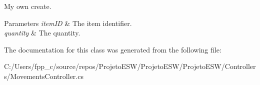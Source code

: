 My own create.


\begin{DoxyParams}{Parameters}
{\em item\+ID} & The item identifier.\\
\hline
{\em quantity} & The quantity.\\
\hline
\end{DoxyParams}


The documentation for this class was generated from the following file\+:\begin{DoxyCompactItemize}
\item 
C\+:/\+Users/fpp\+\_\+c/source/repos/\+Projeto\+E\+S\+W/\+Projeto\+E\+S\+W/\+Projeto\+E\+S\+W/\+Controllers/Movements\+Controller.\+cs\end{DoxyCompactItemize}
